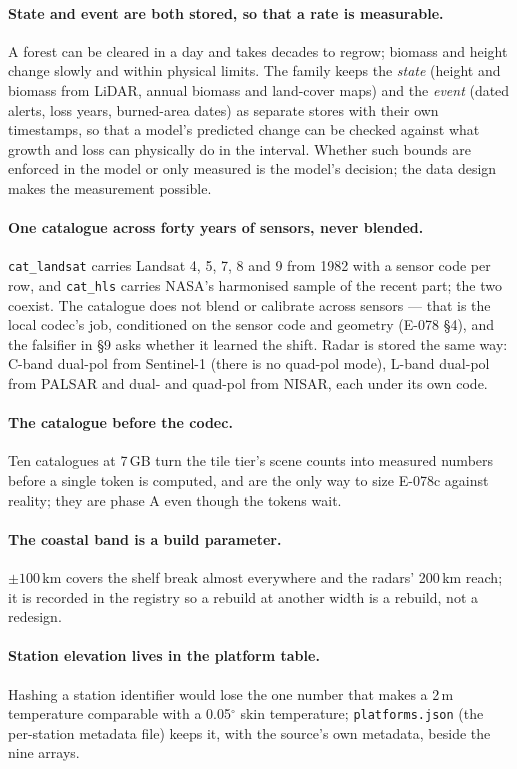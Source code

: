 \documentclass[10pt]{article}
\newcommand{\code}[1]{\texttt{#1}}
\begin{document}
\paragraph{State and event are both stored, so that a rate is measurable.}
A forest can be cleared in a day and takes decades to regrow; biomass and
height change slowly and within physical limits. The family keeps the
\emph{state} (height and biomass from LiDAR, annual biomass and land-cover
maps) and the \emph{event} (dated alerts, loss years, burned-area dates) as
separate stores with their own timestamps, so that a model's predicted
change can be checked against what growth and loss can physically do in the
interval. Whether such bounds are enforced in the model or only measured is
the model's decision; the data design makes the measurement possible.

\paragraph{One catalogue across forty years of sensors, never blended.}
\code{cat\_landsat} carries Landsat 4, 5, 7, 8 and 9 from 1982 with a sensor
code per row, and \code{cat\_hls} carries NASA's harmonised sample of the
recent part; the two coexist. The catalogue does not blend or calibrate
across sensors --- that is the local codec's job, conditioned on the sensor
code and geometry (E-078 \S4), and the falsifier in \S9 asks whether it
learned the shift. Radar is stored the same way: C-band dual-pol from
Sentinel-1 (there is no quad-pol mode), L-band dual-pol from PALSAR and
dual- and quad-pol from NISAR, each under its own code.

\paragraph{The catalogue before the codec.} Ten catalogues at 7\,GB turn
the tile tier's scene counts into measured numbers before a single token is
computed, and are the only way to size E-078c against reality; they are
phase A even though the tokens wait.

\paragraph{The coastal band is a build parameter.} $\pm 100$\,km covers the
shelf break almost everywhere and the radars' 200\,km reach; it is recorded
in the registry so a rebuild at another width is a rebuild, not a redesign.

\paragraph{Station elevation lives in the platform table.} Hashing a station
identifier would lose the one number that makes a 2\,m temperature
comparable with a 0.05$^\circ$ skin temperature; \code{platforms.json} (the per-station metadata file) keeps
it, with the source's own metadata, beside the nine arrays.
\end{document}
